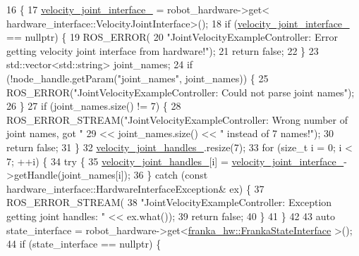 \begin{DoxyCode}
16                                                                       \{
17   \hyperlink{classfranka__example__controllers_1_1JointVelocityExampleController_a34769e0599ac754774227087859986dd}{velocity\_joint\_interface\_} = robot\_hardware->get<
      hardware\_interface::VelocityJointInterface>();
18   \textcolor{keywordflow}{if} (\hyperlink{classfranka__example__controllers_1_1JointVelocityExampleController_a34769e0599ac754774227087859986dd}{velocity\_joint\_interface\_} == \textcolor{keyword}{nullptr}) \{
19     ROS\_ERROR(
20         \textcolor{stringliteral}{"JointVelocityExampleController: Error getting velocity joint interface from hardware!"});
21     \textcolor{keywordflow}{return} \textcolor{keyword}{false};
22   \}
23   std::vector<std::string> joint\_names;
24   \textcolor{keywordflow}{if} (!node\_handle.getParam(\textcolor{stringliteral}{"joint\_names"}, joint\_names)) \{
25     ROS\_ERROR(\textcolor{stringliteral}{"JointVelocityExampleController: Could not parse joint names"});
26   \}
27   \textcolor{keywordflow}{if} (joint\_names.size() != 7) \{
28     ROS\_ERROR\_STREAM(\textcolor{stringliteral}{"JointVelocityExampleController: Wrong number of joint names, got "}
29                      << joint\_names.size() << \textcolor{stringliteral}{" instead of 7 names!"});
30     \textcolor{keywordflow}{return} \textcolor{keyword}{false};
31   \}
32   \hyperlink{classfranka__example__controllers_1_1JointVelocityExampleController_ab88c025c1a93924c079416fe2dbe011e}{velocity\_joint\_handles\_}.resize(7);
33   \textcolor{keywordflow}{for} (\textcolor{keywordtype}{size\_t} i = 0; i < 7; ++i) \{
34     \textcolor{keywordflow}{try} \{
35       \hyperlink{classfranka__example__controllers_1_1JointVelocityExampleController_ab88c025c1a93924c079416fe2dbe011e}{velocity\_joint\_handles\_}[i] = 
      \hyperlink{classfranka__example__controllers_1_1JointVelocityExampleController_a34769e0599ac754774227087859986dd}{velocity\_joint\_interface\_}->getHandle(joint\_names[i]);
36     \} \textcolor{keywordflow}{catch} (\textcolor{keyword}{const} hardware\_interface::HardwareInterfaceException& ex) \{
37       ROS\_ERROR\_STREAM(
38           \textcolor{stringliteral}{"JointVelocityExampleController: Exception getting joint handles: "} << ex.what());
39       \textcolor{keywordflow}{return} \textcolor{keyword}{false};
40     \}
41   \}
42 
43   \textcolor{keyword}{auto} state\_interface = robot\_hardware->get<\hyperlink{classfranka__hw_1_1FrankaStateInterface}{franka\_hw::FrankaStateInterface}
      >();
44   \textcolor{keywordflow}{if} (state\_interface == \textcolor{keyword}{nullptr}) \{

\end{DoxyCode}
